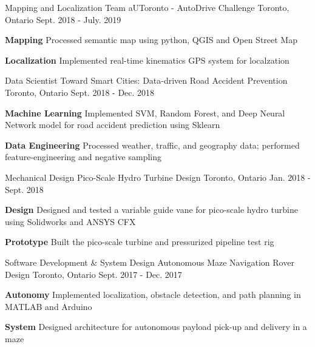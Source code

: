 \begin{cventries}
  \cventry
  {Mapping and Localization Team}
  {aUToronto - AutoDrive Challenge}
  {Toronto, Ontario}
  {Sept. 2018 - July. 2019}
  {
    \begin{cvitems}
      \item {\textbf{Mapping} Processed semantic map using python, QGIS and Open Street Map}
      \item {\textbf{Localization} Implemented real-time kinematics GPS system for localzation}
    \end{cvitems}
  }
  \cventry
  {Data Scientist}
  {Toward Smart Cities: Data-driven Road Accident Prevention}
  {Toronto, Ontario}
  {Sept. 2018 - Dec. 2018}
  {
    \begin{cvitems}
      \item {\textbf{Machine Learning} Implemented SVM, Random Forest, and Deep Neural Network model for road accident prediction using Sklearn}
      \item {\textbf{Data Engineering} Processed weather, traffic, and geography data; performed feature-engineering and negative sampling}
    \end{cvitems}
  }
  \cventry
    {Mechanical Design}
    {Pico-Scale Hydro Turbine Design}
    {Toronto, Ontario}
    {Jan. 2018 - Sept. 2018}
    {
      \begin{cvitems}
        \item {\textbf{Design} Designed and tested a variable guide vane for pico-scale hydro turbine using Solidworks and ANSYS CFX}
        \item {\textbf{Prototype} Built the pico-scale turbine and pressurized pipeline test rig}
      \end{cvitems}
    }
    \cventry
    {Software Development \& System Design}
    {Autonomous Maze Navigation Rover Design}
    {Toronto, Ontario}
    {Sept. 2017 - Dec. 2017}
    {
      \begin{cvitems}
        \item { \textbf{Autonomy} Implemented localization, obstacle detection, and path planning in MATLAB and Arduino}
        \item { \textbf{System} Designed architecture for autonomous payload pick-up and delivery in a maze}
      \end{cvitems}
    }
\end{cventries}

